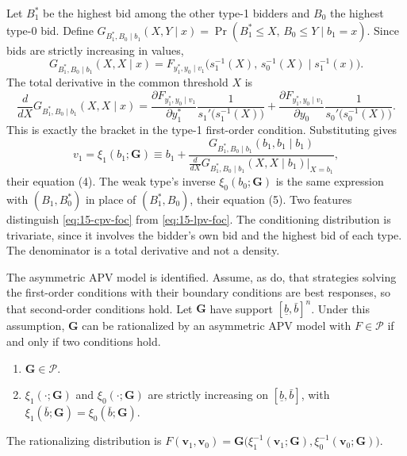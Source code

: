  Let $B_1^\ast$ be the highest bid among the other type-1 bidders and $B_0$ the highest
type-0 bid. Define $G_{B_1^\ast,B_0\mid b_1}(X,Y\mid x)=\Pr(B_1^\ast\le X,\,B_0\le Y\mid b_1=x)$. Since bids
are strictly increasing in values,
\begin{equation*}
  G_{B_1^\ast,B_0\mid b_1}(X,X\mid x)=F_{y_1^\ast,y_0\mid v_1}\bigl(s_1^{-1}(X),\,s_0^{-1}(X)\mid s_1^{-1}(x)\bigr).
\end{equation*}
The total derivative in the common threshold $X$ is
\begin{equation*}
  \frac{d}{dX}G_{B_1^\ast,B_0\mid b_1}(X,X\mid x)
  =\frac{\partial F_{y_1^\ast,y_0\mid v_1}}{\partial y_1^\ast}\frac{1}{s_1'\bigl(s_1^{-1}(X)\bigr)}
  +\frac{\partial F_{y_1^\ast,y_0\mid v_1}}{\partial y_0}\frac{1}{s_0'\bigl(s_0^{-1}(X)\bigr)}.
\end{equation*}
This is exactly the bracket in the type-1 first-order condition. Substituting gives
\begin{equation}\label{eq:15-cpv-foc}
  v_1=\xi_1(b_1;\bm G)\equiv b_1+\frac{G_{B_1^\ast,B_0\mid b_1}(b_1,b_1\mid b_1)}
  {\frac{d}{dX}G_{B_1^\ast,B_0\mid b_1}(X,X\mid b_1)\big|_{X=b_1}},
\end{equation}
their equation (4). The weak type's inverse $\xi_0(b_0;\bm G)$ is the same expression with
$(B_1,B_0^\ast)$ in place of $(B_1^\ast,B_0)$, their equation (5). Two features distinguish
\eqref{eq:15-cpv-foc} from \eqref{eq:15-lpv-foc}. The conditioning distribution is trivariate, since it
involves the bidder's own bid and the highest bid of each type. The denominator is a total derivative and not
a density.

\begin{proposition}\label{prop:15-cpv}
The asymmetric APV model is identified. Assume, as \citet[footnote~5]{CampoPerrigneVuong2003} do, that strategies
solving the first-order conditions with their boundary conditions are best responses, so that second-order
conditions hold. Let $\bm G$ have support $[\underline b,\bar b]^n$. Under this assumption, $\bm G$ can be
rationalized by an asymmetric APV model with $F\in\mathcal P$ if and only if two conditions hold.
\begin{enumerate}[label=(\roman*)]
  \item $\bm G\in\mathcal P$.
  \item $\xi_1(\cdot;\bm G)$ and $\xi_0(\cdot;\bm G)$ are strictly increasing on $[\underline b,\bar b]$, with
  $\xi_1(\bar b;\bm G)=\xi_0(\bar b;\bm G)$.
\end{enumerate}
The rationalizing distribution is
$F(\bm v_1,\bm v_0)=\bm G\bigl(\xi_1^{-1}(\bm v_1;\bm G),\xi_0^{-1}(\bm v_0;\bm G)\bigr)$.
\end{proposition}

